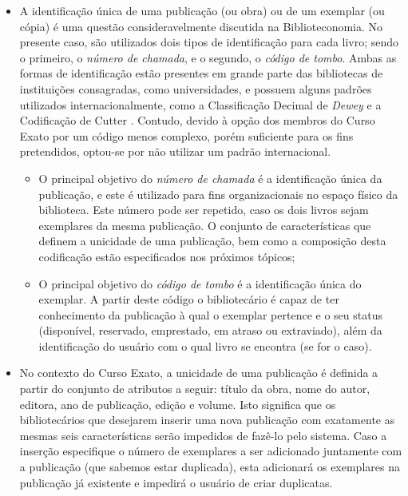 \documentclass[a4paper]{article}
\begin{document}
\begin{itemize}
\item A identificação única de uma publicação (ou obra) ou de um exemplar (ou cópia) é uma questão consideravelmente discutida na Biblioteconomia. No presente caso, são utilizados dois tipos de identificação para cada livro; sendo o primeiro, o \textit{número de chamada}, e o segundo, o \textit{código de tombo}. Ambas as formas de identificação estão presentes em grande parte das bibliotecas de instituições consagradas, como universidades, e possuem alguns padrões utilizados internacionalmente, como a Classificação Decimal de \textit{Dewey} \cite{dewey} e a Codificação de Cutter \cite{cutter}. Contudo, devido à opção dos membros do Curso Exato por um código menos complexo, porém suficiente para os fins pretendidos, optou-se por não utilizar um padrão internacional. 
\begin{itemize}
\item O principal objetivo do \textit{número de chamada} é a identificação única da publicação, e este é utilizado para fins organizacionais no espaço físico da biblioteca. Este número pode ser repetido, caso os dois livros sejam exemplares da mesma publicação. O conjunto de características que definem a unicidade de uma publicação, bem como a composição desta codificação estão especificados nos próximos tópicos;
\item O principal objetivo do \textit{código de tombo} é a identificação única do exemplar. A partir deste código o bibliotecário é capaz de ter conhecimento da publicação à qual o exemplar pertence e o seu status (disponível, reservado, emprestado, em atraso ou extraviado), além da identificação do usuário com o qual livro se encontra (se for o caso).
\end{itemize}

\item No contexto do Curso Exato, a unicidade de uma publicação é definida a partir do conjunto de atributos a seguir: título da obra, nome do autor, editora, ano de publicação, edição e volume. Isto significa que os bibliotecários que desejarem inserir uma nova publicação com exatamente as mesmas seis características serão impedidos de fazê-lo pelo sistema. Caso a inserção especifique o número de exemplares a ser adicionado juntamente com a publicação (que sabemos estar duplicada), esta adicionará os exemplares na publicação já existente e impedirá o usuário de criar duplicatas.


\end{itemize}
\end{document}
